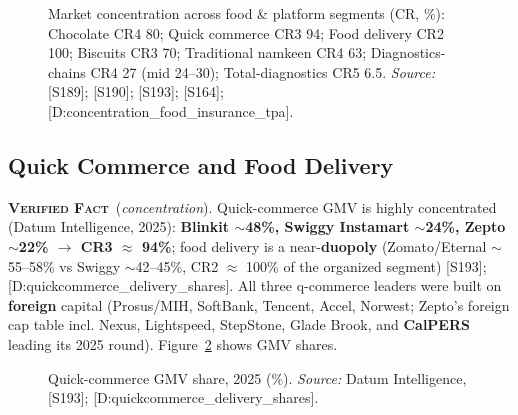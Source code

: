 \documentclass[11pt,a4paper]{article}
\newcommand{\VF}{\textcolor{vfcol}{\textsc{\textbf{Verified Fact}}}}
\newcommand{\cs}[1]{\textnormal{[#1]}}
\begin{document}
\begin{figure}[htbp]
\centering
{}
\caption{Market concentration across food \& platform segments (CR, \%): Chocolate CR4 80; Quick commerce CR3 94; Food delivery CR2 100; Biscuits CR3 70; Traditional namkeen CR4 63; Diagnostics-chains CR4 27 (mid 24--30); Total-diagnostics CR5 6.5. \textit{Source:} \cs{S189}; \cs{S190}; \cs{S193}; \cs{S164}; \cs{D:concentration\_food\_insurance\_tpa}.}
\label{fig:ch5food}
\end{figure}

\subsection{Quick Commerce and Food Delivery}

\VF\ (\emph{concentration}). Quick-commerce GMV is highly concentrated (Datum Intelligence, 2025): \textbf{Blinkit $\sim$48\%, Swiggy Instamart $\sim$24\%, Zepto $\sim$22\% $\rightarrow$ CR3 $\approx$ 94\%}; food delivery is a near-\textbf{duopoly} (Zomato/Eternal $\sim$55--58\% vs Swiggy $\sim$42--45\%, CR2 $\approx$ 100\% of the organized segment) \cs{S193}; \cs{D:quickcommerce\_delivery\_shares}. All three q-commerce leaders were built on \textbf{foreign} capital (Prosus/MIH, SoftBank, Tencent, Accel, Norwest; Zepto's foreign cap table incl. Nexus, Lightspeed, StepStone, Glade Brook, and \textbf{CalPERS} leading its 2025 round). Figure~\ref{fig:ch6qcomm} shows GMV shares.

\begin{figure}[htbp]
\centering
{}
\caption{Quick-commerce GMV share, 2025 (\%). \textit{Source:} Datum Intelligence, \cs{S193}; \cs{D:quickcommerce\_delivery\_shares}.}
\label{fig:ch6qcomm}
\end{figure}
\end{document}
